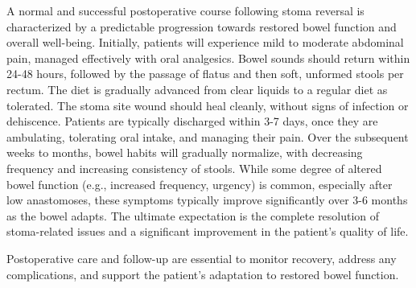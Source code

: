 A normal and successful postoperative course following stoma reversal is characterized by a predictable progression towards restored bowel function and overall well-being. Initially, patients will experience mild to moderate abdominal pain, managed effectively with oral analgesics. Bowel sounds should return within 24-48 hours, followed by the passage of flatus and then soft, unformed stools per rectum. The diet is gradually advanced from clear liquids to a regular diet as tolerated. The stoma site wound should heal cleanly, without signs of infection or dehiscence. Patients are typically discharged within 3-7 days, once they are ambulating, tolerating oral intake, and managing their pain. Over the subsequent weeks to months, bowel habits will gradually normalize, with decreasing frequency and increasing consistency of stools. While some degree of altered bowel function (e.g., increased frequency, urgency) is common, especially after low anastomoses, these symptoms typically improve significantly over 3-6 months as the bowel adapts. The ultimate expectation is the complete resolution of stoma-related issues and a significant improvement in the patient's quality of life.

Postoperative care and follow-up are essential to monitor recovery, address any complications, and support the patient's adaptation to restored bowel function.

